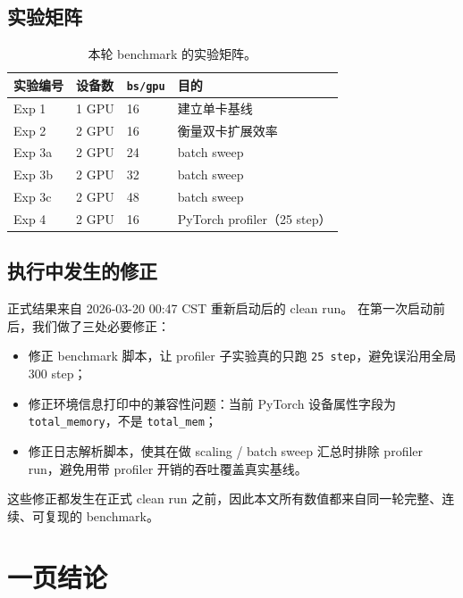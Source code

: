 \documentclass[11pt,a4paper]{ctexart}
\begin{document}
\subsection{实验矩阵}

\begin{table}[H]
\centering
\small
\caption{本轮 benchmark 的实验矩阵。}
\begin{tabular}{llll}
\toprule
实验编号 & 设备数 & \texttt{bs/gpu} & 目的 \\
\midrule
Exp 1 & 1 GPU & 16 & 建立单卡基线 \\
Exp 2 & 2 GPU & 16 & 衡量双卡扩展效率 \\
Exp 3a & 2 GPU & 24 & batch sweep \\
Exp 3b & 2 GPU & 32 & batch sweep \\
Exp 3c & 2 GPU & 48 & batch sweep \\
Exp 4 & 2 GPU & 16 & PyTorch profiler（25 step） \\
\bottomrule
\end{tabular}
\end{table}

\subsection{执行中发生的修正}

正式结果来自 2026-03-20 00:47 CST 重新启动后的 clean run。
在第一次启动前后，我们做了三处必要修正：
\begin{itemize}[leftmargin=2em]
  \item 修正 benchmark 脚本，让 profiler 子实验真的只跑 \texttt{25 step}，避免误沿用全局 300 step；
  \item 修正环境信息打印中的兼容性问题：当前 PyTorch 设备属性字段为 \texttt{total\_memory}，不是 \texttt{total\_mem}；
  \item 修正日志解析脚本，使其在做 scaling / batch sweep 汇总时排除 profiler run，避免用带 profiler 开销的吞吐覆盖真实基线。
\end{itemize}

这些修正都发生在正式 clean run 之前，因此本文所有数值都来自同一轮完整、连续、可复现的 benchmark。

\section{一页结论}
\end{document}
